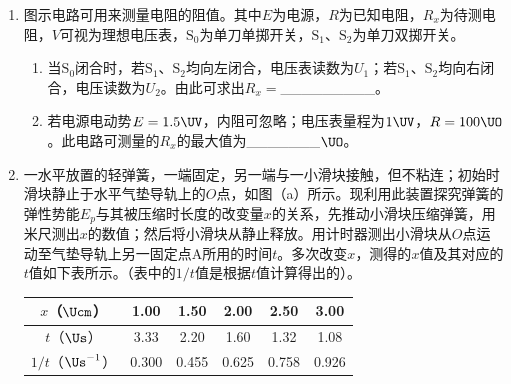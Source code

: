 \documentclass[\gkver]{gaokaozhenti}
\begin{document}
\begin{enumerate}
\item
图示电路可用来测量电阻的阻值。其中$E$为电源，$R$为已知电阻，$R_{x}$为待测电阻，$V$可视为理想电压表，$\mathrm{S}_{0}$为单刀单掷开关，$\mathrm{S}_{1}$、$\mathrm{S}_{2}$为单刀双掷开关。
\begin{enumerate}
	\item
	当$\mathrm{S}_{0}$闭合时，若$\mathrm{S}_{1}$、$\mathrm{S}_{2}$均向左闭合，电压表读数为$U_{1}$；若$\mathrm{S}_{1}$、$\mathrm{S}_{2}$均向右闭合，电压读数为$U_{2}$。由此可求出$R_{x}=$\_\_\_\_\_\_\_\_\_。
	\item
	若电源电动势$E=1.5\UV$，内阻可忽略；电压表量程为$1\UV$，$R=100\UO$。此电路可测量的$R_{x}$的最大值为\_\_\_\_\_\_\_$\UO$。
\end{enumerate}

\item
一水平放置的轻弹簧，一端固定，另一端与一小滑块接触，但不粘连；初始时滑块静止于水平气垫导轨上的$O$点，如图（a）所示。现利用此装置探究弹簧的弹性势能$E_{p}$与其被压缩时长度的改变量$x$的关系，先推动小滑块压缩弹簧，用米尺测出$x$的数值；然后将小滑块从静止释放。用计时器测出小滑块从$O$点运动至气垫导轨上另一固定点A所用的时间$t$。多次改变$x$，测得的$x$值及其对应的$t$值如下表所示。（表中的$1/t$值是根据$t$值计算得出的）。

\begin{center}
\begin{tabular}{|c|c|c|c|c|c|}
\hline
$x$（$\Ucm$） & 1.00 & 1.50 & 2.00 & 2.50 & 3.00 \\ \hline
$t$（$\Us$） & 3.33 & 2.20 & 1.60 & 1.32 & 1.08 \\ \hline
$1/t$（$\Us^{-1}$） & 0.300 & 0.455 & 0.625 & 0.758 & 0.926 \\ \hline
\end{tabular}
\end{center}


\end{enumerate}
\end{document}
